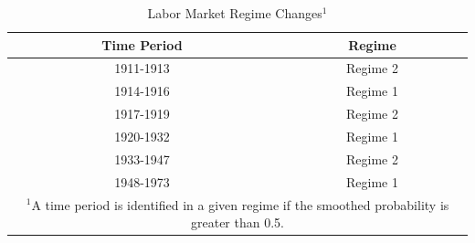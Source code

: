 \documentclass[12pt]{article}
\begin{document}
\begin{table}\caption{Labor Market Regime Changes$^1$}\label{tb:regimes}
\begin{center}
\begin{tabular}{cc}
Time Period & Regime \\ \hline
1911-1913 & Regime 2 \\
1914-1916 & Regime 1 \\
1917-1919 & Regime 2 \\
1920-1932 & Regime 1 \\
1933-1947 & Regime 2 \\
1948-1973 & Regime 1 \\ \hline
\multicolumn{2}{p{2.5in}}{$^1$A time period is identified in a given regime if the smoothed probability is greater than 0.5.}
\end{tabular}
\end{center}
\end{table}
\end{document}

